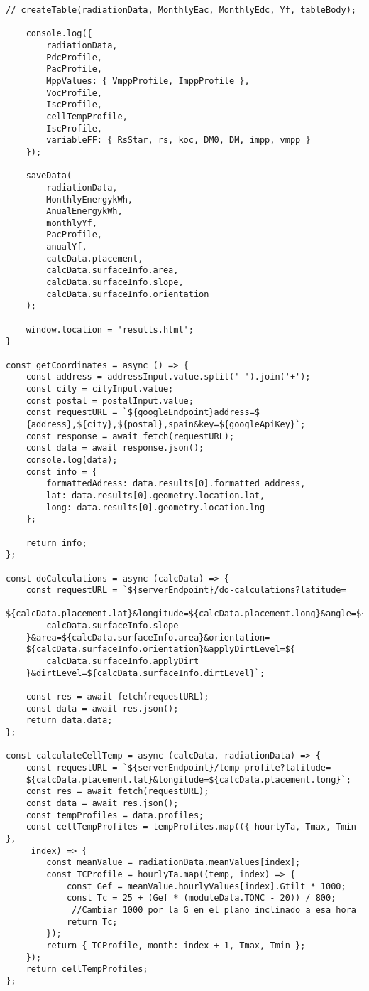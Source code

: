 \begin{lstlisting}[style=ES6, caption={public/scripts/DataAquisition.js}]
	// createTable(radiationData, MonthlyEac, MonthlyEdc, Yf, tableBody);

	console.log({
		radiationData,
		PdcProfile,
		PacProfile,
		MppValues: { VmppProfile, ImppProfile },
		VocProfile,
		IscProfile,
		cellTempProfile,
		IscProfile,
		variableFF: { RsStar, rs, koc, DM0, DM, impp, vmpp }
	});

	saveData(
		radiationData,
		MonthlyEnergykWh,
		AnualEnergykWh,
		monthlyYf,
		PacProfile,
		anualYf,
		calcData.placement,
		calcData.surfaceInfo.area,
		calcData.surfaceInfo.slope,
		calcData.surfaceInfo.orientation
	);

	window.location = 'results.html';
}

const getCoordinates = async () => {
	const address = addressInput.value.split(' ').join('+');
	const city = cityInput.value;
	const postal = postalInput.value;
	const requestURL = `${googleEndpoint}address=$
	{address},${city},${postal},spain&key=${googleApiKey}`;
	const response = await fetch(requestURL);
	const data = await response.json();
	console.log(data);
	const info = {
		formattedAdress: data.results[0].formatted_address,
		lat: data.results[0].geometry.location.lat,
		long: data.results[0].geometry.location.lng
	};

	return info;
};

const doCalculations = async (calcData) => {
	const requestURL = `${serverEndpoint}/do-calculations?latitude=
	${calcData.placement.lat}&longitude=${calcData.placement.long}&angle=${
		calcData.surfaceInfo.slope
	}&area=${calcData.surfaceInfo.area}&orientation=
	${calcData.surfaceInfo.orientation}&applyDirtLevel=${
		calcData.surfaceInfo.applyDirt
	}&dirtLevel=${calcData.surfaceInfo.dirtLevel}`;

	const res = await fetch(requestURL);
	const data = await res.json();
	return data.data;
};

const calculateCellTemp = async (calcData, radiationData) => {
	const requestURL = `${serverEndpoint}/temp-profile?latitude=
	${calcData.placement.lat}&longitude=${calcData.placement.long}`;
	const res = await fetch(requestURL);
	const data = await res.json();
	const tempProfiles = data.profiles;
	const cellTempProfiles = tempProfiles.map(({ hourlyTa, Tmax, Tmin },
	 index) => {
		const meanValue = radiationData.meanValues[index];
		const TCProfile = hourlyTa.map((temp, index) => {
			const Gef = meanValue.hourlyValues[index].Gtilt * 1000;
			const Tc = 25 + (Gef * (moduleData.TONC - 20)) / 800;
			 //Cambiar 1000 por la G en el plano inclinado a esa hora
			return Tc;
		});
		return { TCProfile, month: index + 1, Tmax, Tmin };
	});
	return cellTempProfiles;
};


\end{lstlisting}
